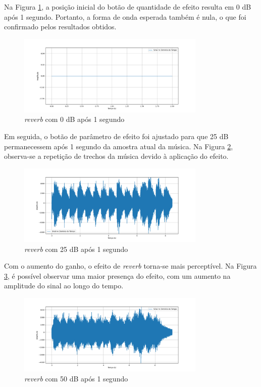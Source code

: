 Na Figura \ref{fig70}, a posição inicial do botão de quantidade de efeito resulta em 0 dB após 1 segundo. Portanto, a forma de onda esperada também é nula, o que foi confirmado pelos resultados obtidos.

\begin{figure}[h]
    \centering
    \includegraphics[width=0.8\textwidth]{figuras/fig70.png}
    \caption{\textit{reverb} com 0 dB após 1 segundo}
    \label{fig70}
\end{figure}

Em seguida, o botão de parâmetro de efeito foi ajustado para que 25 dB permanecessem após 1 segundo da amostra atual da música. Na Figura \ref{fig71}, observa-se a repetição de trechos da música devido à aplicação do efeito.

\begin{figure}[h]
    \centering
    \includegraphics[width=0.8\textwidth]{figuras/fig71.png}
    \caption{\textit{reverb} com 25 dB após 1 segundo}
    \label{fig71}
\end{figure}

Com o aumento do ganho, o efeito de \textit{reverb} torna-se mais perceptível. Na Figura \ref{fig72}, é possível observar uma maior presença do efeito, com um aumento na amplitude do sinal ao longo do tempo.

\begin{figure}[h]
    \centering
    \includegraphics[width=0.8\textwidth]{figuras/fig72.png}
    \caption{\textit{reverb} com 50 dB após 1 segundo}
    \label{fig72}
\end{figure}

